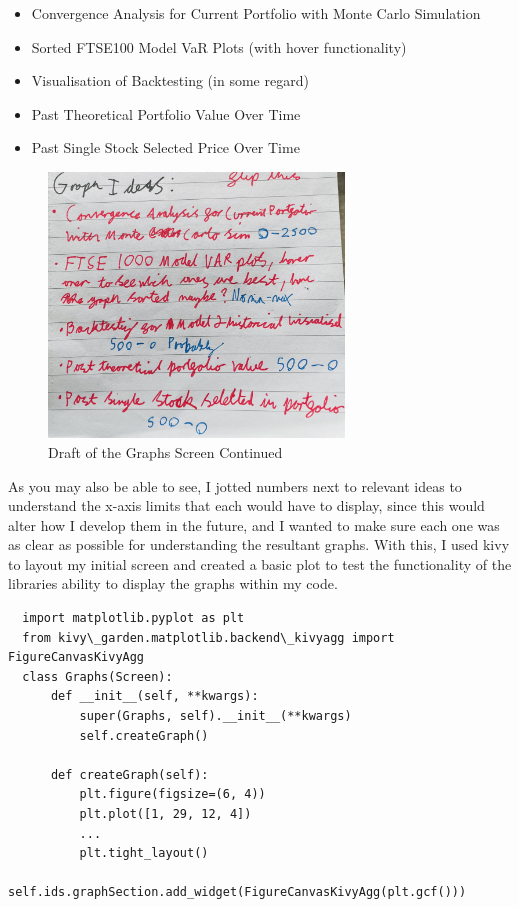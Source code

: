 \documentclass{article}
\begin{document}
\begin{itemize}
  \item Convergence Analysis for Current Portfolio with Monte Carlo Simulation
  \item Sorted FTSE100 Model VaR Plots (with hover functionality)
  \item Visualisation of Backtesting (in some regard)
  \item Past Theoretical Portfolio Value Over Time
  \item Past Single Stock Selected Price Over Time
\end{itemize}

\begin{figure}[h]
  \centering
  \includegraphics[width=0.7\textwidth]{Images/Term 2 Images/IMG_1349 (1).jpg}
  \caption{Draft of the Graphs Screen Continued}
  \label{fig:Graphs Screen Draft 2}
\end{figure}

\vspace{0.3cm}
As you may also be able to see, I jotted numbers next to relevant ideas to understand the x-axis limits that each would have to display, since this would alter how I develop them in the future, and I wanted to make sure each one was as clear as possible for understanding the resultant graphs. With this, I used kivy to layout my initial screen and created a basic plot to test the functionality of the libraries ability to display the graphs within my code. \\\vspace{0.3cm}

\begin{verbatim}
  import matplotlib.pyplot as plt
  from kivy\_garden.matplotlib.backend\_kivyagg import FigureCanvasKivyAgg
  class Graphs(Screen):
      def __init__(self, **kwargs):
          super(Graphs, self).__init__(**kwargs)
          self.createGraph()

      def createGraph(self):
          plt.figure(figsize=(6, 4))
          plt.plot([1, 29, 12, 4])
          ...
          plt.tight_layout()
          self.ids.graphSection.add_widget(FigureCanvasKivyAgg(plt.gcf()))
\end{verbatim}
\end{document}
